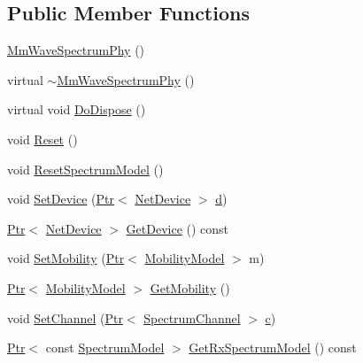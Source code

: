 \subsection*{Public Member Functions}
\begin{DoxyCompactItemize}
\item 
\hyperlink{classns3_1_1MmWaveSpectrumPhy_a42ab040d8a0d0db095bc8439caf3d1d3}{Mm\+Wave\+Spectrum\+Phy} ()
\item 
virtual \hyperlink{classns3_1_1MmWaveSpectrumPhy_a532eb5eab8a53a287fc3b0a609d1b329}{$\sim$\+Mm\+Wave\+Spectrum\+Phy} ()
\item 
virtual void \hyperlink{classns3_1_1MmWaveSpectrumPhy_a9d8001b432b3f733ab158f66b2252e44}{Do\+Dispose} ()
\item 
void \hyperlink{classns3_1_1MmWaveSpectrumPhy_ab8a2977fae59be19ed04e0d99b85a36f}{Reset} ()
\item 
void \hyperlink{classns3_1_1MmWaveSpectrumPhy_a261aa2fceb19bd414529cc654c39f259}{Reset\+Spectrum\+Model} ()
\item 
void \hyperlink{classns3_1_1MmWaveSpectrumPhy_a2b7ffae1d31b01f1c7570811cd30221a}{Set\+Device} (\hyperlink{classns3_1_1Ptr}{Ptr}$<$ \hyperlink{classns3_1_1NetDevice}{Net\+Device} $>$ \hyperlink{lte__pathloss_8m_a1aabac6d068eef6a7bad3fdf50a05cc8}{d})
\item 
\hyperlink{classns3_1_1Ptr}{Ptr}$<$ \hyperlink{classns3_1_1NetDevice}{Net\+Device} $>$ \hyperlink{classns3_1_1MmWaveSpectrumPhy_a32b0f96d89e721d518242dcd754a3416}{Get\+Device} () const 
\item 
void \hyperlink{classns3_1_1MmWaveSpectrumPhy_ab828bbaca7186ebac23dd47d117b0eb1}{Set\+Mobility} (\hyperlink{classns3_1_1Ptr}{Ptr}$<$ \hyperlink{classns3_1_1MobilityModel}{Mobility\+Model} $>$ m)
\item 
\hyperlink{classns3_1_1Ptr}{Ptr}$<$ \hyperlink{classns3_1_1MobilityModel}{Mobility\+Model} $>$ \hyperlink{classns3_1_1MmWaveSpectrumPhy_a5cf900e8864ab9fd21cfa224afa82d5e}{Get\+Mobility} ()
\item 
void \hyperlink{classns3_1_1MmWaveSpectrumPhy_a41ef0e5f351caf30075ee1822323e4b9}{Set\+Channel} (\hyperlink{classns3_1_1Ptr}{Ptr}$<$ \hyperlink{classns3_1_1SpectrumChannel}{Spectrum\+Channel} $>$ \hyperlink{mmwave_2model_2fading-traces_2fading__trace__generator_8m_ae0323a9039add2978bf5b49550572c7c}{c})
\item 
\hyperlink{classns3_1_1Ptr}{Ptr}$<$ const \hyperlink{classns3_1_1SpectrumModel}{Spectrum\+Model} $>$ \hyperlink{classns3_1_1MmWaveSpectrumPhy_aa80953cf4095648ba5b6b8779e2aa0f5}{Get\+Rx\+Spectrum\+Model} () const 

\end{DoxyCompactItemize}
